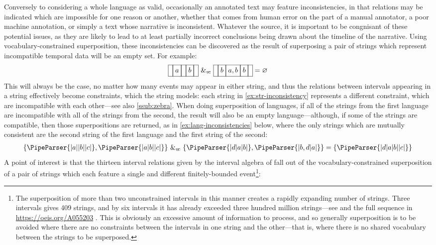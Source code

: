 \documentclass[a4paper,12pt,leqno,twoside]{article}
\newcommand{\vph}[1]{\vphantom{#1}}
\newcommand{\ebox}[1]{\fbox{$\vph{'(),}#1$}}
\newcommand{\nbBefore}[2]{\ebox{#1}\ebox{}\ebox{#2}}
\newcommand{\nbDuring}[2]{\ebox{#2}\ebox{#1,#2}\ebox{#2}}
\newcommand{\Before}[2]{\ebox{}\nbBefore{#1}{#2}\ebox{}}
\newcommand{\During}[2]{\ebox{}\nbDuring{#1}{#2}\ebox{}}
\newcommand{\spvc}{~\&_{v\!c}~}
\renewcommand{\emptyset}{\varnothing}
\newcommand{\EventString}[1]{%
	\renewcommand*{\do}[1]{\ebox{##1}}%
	\PipeParser{#1}%
}
\begin{document}
Conversely to considering a whole language as valid, occasionally an annotated text may feature inconsistencies, in that relations may be indicated which are impossible for one reason or another, whether that comes from human error on the part of a manual annotator, a poor machine annotation, or simply a text whose narrative is inconsistent. Whatever the source, it is important to be congnisant of these potential issues, as they are likely to lead to at least partially incorrect conclusions being drawn about the timeline of the narrative. Using vocabulary-constrained superposition, these inconsistencies can be discovered as the result of superposing a pair of strings which represent incompatible temporal data will be an empty set. For example:
\begin{align}
	\Before{a}{b} \spvc \During{a}{b} = \emptyset\label{ex:str-inconsistency}
\end{align}
This will always be the case, no matter how many events may appear in either string, and thus the relations between intervals appearing in a string effectively become constraints, which the string models: each string in \cref{ex:str-inconsistency} represents a different constraint, which are incompatible with each other---see also \cref{ssub:zebra}. When doing superposition of languages, if all of the strings from the first language are incompatible with all of the strings from the second, the result will also be an empty language---although, if some of the strings are compatible, then those superpositions are returned, as in \cref{ex:lang-inconsistencies} below, where the only strings which are mutually consistent are the second string of the first language and the first string of the second:
\begin{align}
	\{\EventString{{}|a|{}|b|{}|c|{}}, \EventString{{}|a|b|{}|c|{}}\} \spvc \{\EventString{{}|d|a|b|{}}, \EventString{{}|b,d|a|{}}\} = \{\EventString{{}|d|a|b|{}|c|{}}\}\label{ex:lang-inconsistencies}
\end{align}
A point of interest is that the thirteen interval relations given by the interval algebra of \citet{allen1983maintaining} fall out of the vocabulary-constrained superposition of a pair of strings which each feature a single and different finitely-bounded event\footnote{The superposition of more than two unconstrained intervals in this manner creates a rapidly expanding number of strings. Three intervals gives 409 strings, and by six intervals it has already exceeded three hundred million strings---see \citet[p. 129]{woods2017towards} and the full sequence in \url{https://oeis.org/A055203} \citep{oeisA055203}. This is obviously an excessive amount of information to process, and so generally superposition is to be avoided where there are no constraints between the intervals in one string and the other---that is, where there is no shared vocabulary between the strings to be superposed.}:
\end{document}
